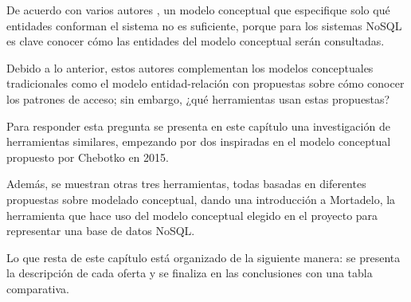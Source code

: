 De acuerdo con varios autores \cite{chebotko_big_2015,de_lima_workload-driven_2015,mior_nose_2017-1}, un modelo conceptual que especifique solo qué entidades conforman el sistema no es suficiente, porque para los sistemas NoSQL es clave conocer cómo las entidades del modelo conceptual serán consultadas.


Debido a lo anterior, estos autores complementan los modelos conceptuales tradicionales como el modelo entidad-relación con propuestas sobre cómo conocer los patrones de acceso; sin embargo, ¿qué herramientas usan estas propuestas?


Para responder esta pregunta se presenta en este capítulo una investigación de herramientas similares, empezando por dos inspiradas en el modelo conceptual propuesto por Chebotko en 2015.


Además, se muestran otras tres herramientas, todas basadas en diferentes propuestas sobre modelado conceptual, dando una introducción a Mortadelo, la herramienta que hace uso del modelo conceptual elegido en el proyecto para representar una base de datos NoSQL.


Lo que resta de este capítulo está organizado de la siguiente manera: se presenta la descripción de cada oferta y se finaliza en las conclusiones con una tabla comparativa.







